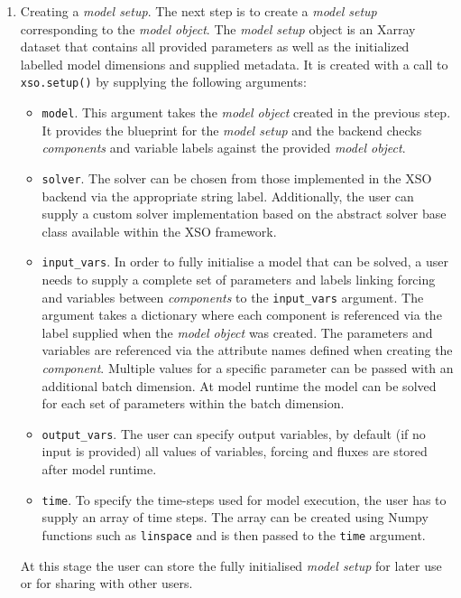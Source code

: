 \documentclass[journal abbreviation, manuscript]{copernicus}
\begin{document}
\begin{enumerate}
    \item Creating a \textit{model setup}. The next step is to create a \textit{model setup} corresponding to the \textit{model object}. The \textit{model setup} object is an Xarray dataset that contains all provided parameters as well as the initialized labelled model dimensions and supplied metadata. It is created with a call to \texttt{xso.setup()} by supplying the following arguments:
    \begin{itemize}
        \item \texttt{model}. This argument takes the \textit{model object} created in the previous step. It provides the blueprint for the \textit{model setup} and the backend checks \textit{components} and variable labels against the provided \textit{model object}.
        \item \texttt{solver}. The solver can be chosen from those implemented in the XSO backend via the appropriate string label. Additionally, the user can supply a custom solver implementation based on the abstract solver base class available within the XSO framework.
        \item \texttt{input\_vars}. In order to fully initialise a model that can be solved, a user needs to supply a complete set of parameters and labels linking forcing and variables between \textit{components} to the \texttt{input\_vars} argument. The argument takes a dictionary where each component is referenced via the label supplied when the \textit{model object} was created. The parameters and variables are referenced via the attribute names defined when creating the \textit{component}. Multiple values for a specific parameter can be passed with an additional batch dimension. At model runtime the model can be solved for each set of parameters within the batch dimension.
        \item \texttt{output\_vars}. The user can specify output variables, by default (if no input is provided) all values of variables, forcing and fluxes are stored after model runtime.
        \item \texttt{time}. To specify the time-steps used for model execution, the user has to supply an array of time steps. The array can be created using Numpy functions such as \texttt{linspace} and is then passed  to the \texttt{time} argument.
    \end{itemize}
    At this stage the user can store the fully initialised \textit{model setup} for later use or for sharing with other users.
    

\end{enumerate}
\end{document}

